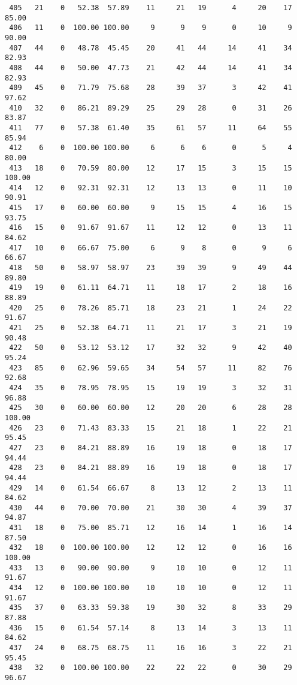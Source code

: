 \begin{verbatim}
 405   21    0   52.38  57.89    11     21   19      4     20    17    85.00
 406   11    0  100.00 100.00     9      9    9      0     10     9    90.00
 407   44    0   48.78  45.45    20     41   44     14     41    34    82.93
 408   44    0   50.00  47.73    21     42   44     14     41    34    82.93
 409   45    0   71.79  75.68    28     39   37      3     42    41    97.62
 410   32    0   86.21  89.29    25     29   28      0     31    26    83.87
 411   77    0   57.38  61.40    35     61   57     11     64    55    85.94
 412    6    0  100.00 100.00     6      6    6      0      5     4    80.00
 413   18    0   70.59  80.00    12     17   15      3     15    15   100.00
 414   12    0   92.31  92.31    12     13   13      0     11    10    90.91
 415   17    0   60.00  60.00     9     15   15      4     16    15    93.75
 416   15    0   91.67  91.67    11     12   12      0     13    11    84.62
 417   10    0   66.67  75.00     6      9    8      0      9     6    66.67
 418   50    0   58.97  58.97    23     39   39      9     49    44    89.80
 419   19    0   61.11  64.71    11     18   17      2     18    16    88.89
 420   25    0   78.26  85.71    18     23   21      1     24    22    91.67
 421   25    0   52.38  64.71    11     21   17      3     21    19    90.48
 422   50    0   53.12  53.12    17     32   32      9     42    40    95.24
 423   85    0   62.96  59.65    34     54   57     11     82    76    92.68
 424   35    0   78.95  78.95    15     19   19      3     32    31    96.88
 425   30    0   60.00  60.00    12     20   20      6     28    28   100.00
 426   23    0   71.43  83.33    15     21   18      1     22    21    95.45
 427   23    0   84.21  88.89    16     19   18      0     18    17    94.44
 428   23    0   84.21  88.89    16     19   18      0     18    17    94.44
 429   14    0   61.54  66.67     8     13   12      2     13    11    84.62
 430   44    0   70.00  70.00    21     30   30      4     39    37    94.87
 431   18    0   75.00  85.71    12     16   14      1     16    14    87.50
 432   18    0  100.00 100.00    12     12   12      0     16    16   100.00
 433   13    0   90.00  90.00     9     10   10      0     12    11    91.67
 434   12    0  100.00 100.00    10     10   10      0     12    11    91.67
 435   37    0   63.33  59.38    19     30   32      8     33    29    87.88
 436   15    0   61.54  57.14     8     13   14      3     13    11    84.62
 437   24    0   68.75  68.75    11     16   16      3     22    21    95.45
 438   32    0  100.00 100.00    22     22   22      0     30    29    96.67

\end{verbatim}
